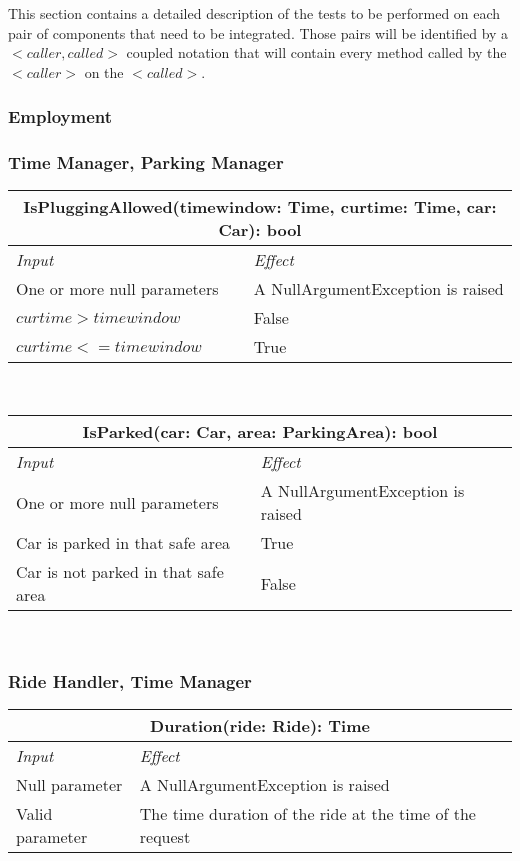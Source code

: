 	\label{sec: individual_steps}
	
	This section contains a detailed description of the tests to be performed on each pair of components that need to be integrated. Those pairs will be identified by a $< caller, called >$ coupled notation that will contain every method called by the $< caller >$ on the $< called >$. 

	\subsubsection{Employment}
			
		\subsubsection*{Time Manager, Parking Manager}
		
			\begin{tabular}{ |l|l| }
				\hline
				\multicolumn{2}{|c|}{IsPluggingAllowed(timewindow: Time, curtime: Time, car: Car): bool}\\
				\hline
				\textit{Input} & \textit{Effect}\\ \hline
				One or more null parameters & A NullArgumentException is raised\\ \hline
				$curtime > timewindow$ & False\\ \hline
				$curtime <= timewindow$ & True\\ \hline
			\end{tabular}
			\\
			\begin{tabular}{ |l|l| }
				\hline
				\multicolumn{2}{|c|}{IsParked(car: Car, area: ParkingArea): bool}\\
				\hline
				\textit{Input} & \textit{Effect}\\ \hline
				One or more null parameters & A NullArgumentException is raised\\ \hline
				Car is parked in that safe area & True\\ \hline
				Car is not parked in that safe area & False\\ \hline
			\end{tabular}
			\\			
		
		
		
		\subsubsection*{Ride Handler, Time Manager}
			\begin{tabular}{ |l|l| }
				\hline
				\multicolumn{2}{|c|}{Duration(ride: Ride): Time}\\
				\hline
				\textit{Input} & \textit{Effect}\\ \hline
				Null parameter & A NullArgumentException is raised\\ \hline
				Valid parameter & The time duration of the ride at the time of the request\\ \hline
			\end{tabular}
			\\
		
